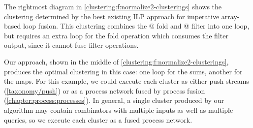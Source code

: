 The rightmost diagram in \cref{clustering:f:normalize2-clusterings} shows the clustering determined by the best existing ILP approach for imperative array-based loop fusion.
This clustering combines the @ fold and @ filter into one loop, but requires an extra loop for the fold operation which consumes the filter output, since it cannot fuse filter operations.

Our approach, shown in the middle of \cref{clustering:f:normalize2-clusterings}, produces the optimal clustering in this case: one loop for the sums, another for the maps.
For this example, we could execute each cluster as either push streams (\cref{taxonomy/push}) or as a process network fused by process fusion (\cref{chapter:process:processes}).
In general, a single cluster produced by our algorithm may contain combinators with multiple inputs as well as multiple queries, so we execute each cluster as a fused process network.




